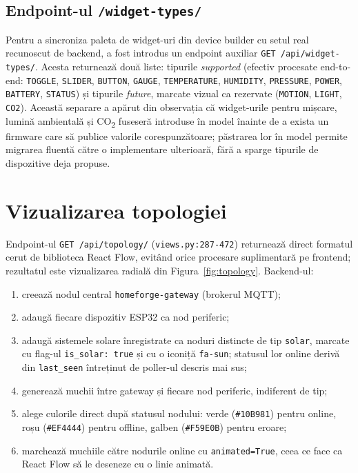 \subsection{Endpoint-ul \texttt{/widget-types/}}
Pentru a sincroniza paleta de widget-uri din device builder cu setul real recunoscut de backend, a fost introdus un endpoint auxiliar \texttt{GET /api/widget-types/}. Acesta returnează două liste: tipurile \emph{supported} (efectiv procesate end-to-end: \texttt{TOGGLE}, \texttt{SLIDER}, \texttt{BUTTON}, \texttt{GAUGE}, \texttt{TEMPERATURE}, \texttt{HUMIDITY}, \texttt{PRESSURE}, \texttt{POWER}, \texttt{BATTERY}, \texttt{STATUS}) și tipurile \emph{future}, marcate vizual ca rezervate (\texttt{MOTION}, \texttt{LIGHT}, \texttt{CO2}). Această separare a apărut din observația că widget-urile pentru mișcare, lumină ambientală și CO\textsubscript{2} fuseseră introduse în model înainte de a exista un firmware care să publice valorile corespunzătoare; păstrarea lor în model permite migrarea fluentă către o implementare ulterioară, fără a sparge tipurile de dispozitive deja propuse.

\section{Vizualizarea topologiei}
Endpoint-ul \texttt{GET /api/topology/} (\texttt{views.py:287-472}) returnează direct formatul cerut de biblioteca React Flow, evitând orice procesare suplimentară pe frontend; rezultatul este vizualizarea radială din Figura~\ref{fig:topology}. Backend-ul:
\begin{enumerate}
    \item creează nodul central \texttt{homeforge-gateway} (brokerul MQTT);
    \item adaugă fiecare dispozitiv ESP32 ca nod periferic;
    \item adaugă sistemele solare înregistrate ca noduri distincte de tip \texttt{solar}, marcate cu flag-ul \texttt{is\_solar: true} și cu o iconiță \texttt{fa-sun}; statusul lor online derivă din \texttt{last\_seen} întreținut de poller-ul descris mai sus;
    \item generează muchii între gateway și fiecare nod periferic, indiferent de tip;
    \item alege culorile direct după statusul nodului: verde (\texttt{\#10B981}) pentru online, roșu (\texttt{\#EF4444}) pentru offline, galben (\texttt{\#F59E0B}) pentru eroare;
    \item marchează muchiile către nodurile online cu \texttt{animated=True}, ceea ce face ca React Flow să le deseneze cu o linie animată.
\end{enumerate}

